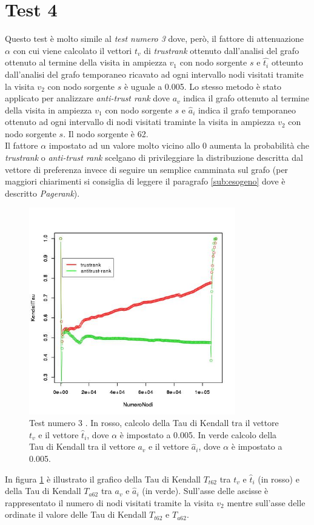 \section{Test 4}
Questo test è molto simile al \textit{test numero 3} dove, però, il fattore di attenuazione \(\alpha\) con cui viene calcolato il vettori \(t_v\) di \textit{trustrank} ottenuto dall'analisi del grafo ottenuto al termine della visita in ampiezza \(v_1\) con nodo sorgente \(s\) e \(\hat{t_i}\) otteunto dall'analisi del grafo temporaneo ricavato ad ogni intervallo nodi visitati tramite la visita \(v_2\) con nodo sorgente \(s\) è uguale a 0.005. Lo stesso metodo è stato applicato per analizzare \textit{anti-trust rank} dove \(a_v\) indica il grafo ottenuto al termine della visita in ampiezza \(v_1\) con nodo sorgente \(s\) e \(\hat{a}_i\) indica il grafo temporaneo ottenuto ad ogni intervallo di nodi visitati traminte la visita in ampiezza \(v_2\) con nodo sorgente \(s\). Il nodo sorgente è 62.\\
Il fattore \(\alpha\) impostato ad un valore molto vicino allo 0 aumenta la probabilità che \textit{trustrank} o \textit{anti-trust rank} scelgano di privileggiare la distribuzione descritta dal vettore di preferenza invece di seguire un semplice camminata sul grafo (per maggiori chiarimenti si consiglia di leggere il paragrafo \ref{sub:esogeno} dove è descritto \textit{Pagerank}).
\begin{figure}
 \centering
 \includegraphics[height=9cm]{immagini/test3/coplotTrustAnti_Mode1_set3776_62_alpha0005}
  \caption{Test numero 3 . In rosso, calcolo della Tau di Kendall tra il vettore $t_v$ e il vettore $\hat{t}_i$, dove $\alpha$ è impostato a 0.005. In verde calcolo della Tau di Kendall tra il vettore $a_v$ e il vettore $\hat{a}_i$, dove $\alpha$ è impostato a 0.005.}
 \label{fig:test3coplotTrustAntiModeB620005}
\end{figure}

In figura \ref{fig:test3coplotTrustAntiModeB620005} è illustrato il grafico della Tau di Kendall \(T_{t62}\) tra \(t_v\) e \(\hat{t}_i\) (in rosso)  e della Tau di Kendall \(T_{a62}\) tra \(a_v\) e \(\hat{a}_i\) (in verde). Sull'asse delle ascisse è rappresentato il numero di nodi visitati tramite la visita \(v_2\) mentre sull'asse delle ordinate il valore delle Tau di Kendall \(T_{t62}\) e \(T_{a62}\).




 

 
